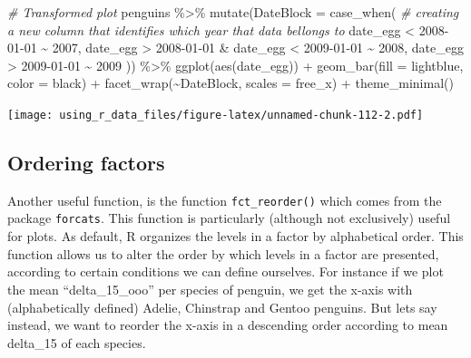 \documentclass[
]{book}
\newenvironment{Shaded}{\begin{snugshade}}{\end{snugshade}}
\newcommand{\AttributeTok}[1]{\textcolor[rgb]{0.77,0.63,0.00}{#1}}
\newcommand{\CommentTok}[1]{\textcolor[rgb]{0.56,0.35,0.01}{\textit{#1}}}
\newcommand{\FunctionTok}[1]{\textcolor[rgb]{0.00,0.00,0.00}{#1}}
\newcommand{\NormalTok}[1]{#1}
\newcommand{\SpecialCharTok}[1]{\textcolor[rgb]{0.00,0.00,0.00}{#1}}
\newcommand{\StringTok}[1]{\textcolor[rgb]{0.31,0.60,0.02}{#1}}
\begin{document}
\begin{Shaded}
\begin{Highlighting}[]
\CommentTok{\# Transformed plot}
\NormalTok{penguins }\SpecialCharTok{\%\textgreater{}\%} 
  \FunctionTok{mutate}\NormalTok{(}\AttributeTok{DateBlock =} \FunctionTok{case\_when}\NormalTok{(  }\CommentTok{\# creating a new column that identifies which year that data bellongs to}
\NormalTok{    date\_egg }\SpecialCharTok{\textless{}} \StringTok{\textquotesingle{}2008{-}01{-}01\textquotesingle{}} \SpecialCharTok{\textasciitilde{}} \StringTok{\textquotesingle{}2007\textquotesingle{}}\NormalTok{,}
\NormalTok{    date\_egg }\SpecialCharTok{\textgreater{}} \StringTok{\textquotesingle{}2008{-}01{-}01\textquotesingle{}} \SpecialCharTok{\&}\NormalTok{ date\_egg }\SpecialCharTok{\textless{}} \StringTok{\textquotesingle{}2009{-}01{-}01\textquotesingle{}} \SpecialCharTok{\textasciitilde{}} \StringTok{\textquotesingle{}2008\textquotesingle{}}\NormalTok{,}
\NormalTok{    date\_egg }\SpecialCharTok{\textgreater{}} \StringTok{\textquotesingle{}2009{-}01{-}01\textquotesingle{}}  \SpecialCharTok{\textasciitilde{}} \StringTok{\textquotesingle{}2009\textquotesingle{}}
\NormalTok{  )) }\SpecialCharTok{\%\textgreater{}\%} 
  \FunctionTok{ggplot}\NormalTok{(}\FunctionTok{aes}\NormalTok{(date\_egg)) }\SpecialCharTok{+}
  \FunctionTok{geom\_bar}\NormalTok{(}\AttributeTok{fill =} \StringTok{\textquotesingle{}lightblue\textquotesingle{}}\NormalTok{, }\AttributeTok{color =} \StringTok{\textquotesingle{}black\textquotesingle{}}\NormalTok{) }\SpecialCharTok{+} 
  \FunctionTok{facet\_wrap}\NormalTok{(}\SpecialCharTok{\textasciitilde{}}\NormalTok{DateBlock, }\AttributeTok{scales =} \StringTok{\textquotesingle{}free\_x\textquotesingle{}}\NormalTok{) }\SpecialCharTok{+}
  \FunctionTok{theme\_minimal}\NormalTok{()}
\end{Highlighting}
\end{Shaded}

\texttt{[image: using\_r\_data\_files/figure-latex/unnamed-chunk-112-2.pdf]}

\hypertarget{ordering-factors}{%
\subsection{Ordering factors}\label{ordering-factors}}

Another useful function, is the function \texttt{fct\_reorder()} which comes from the package \texttt{forcats}.
This function is particularly (although not exclusively) useful for plots.
As default, R organizes the levels in a factor by alphabetical order.
This function allows us to alter the order by which levels in a factor are presented, according to certain conditions we can define ourselves.
For instance if we plot the mean ``delta\_15\_ooo'' per species of penguin, we get the x-axis with (alphabetically defined) Adelie, Chinstrap and Gentoo penguins.
But lets say instead, we want to reorder the x-axis in a descending order according to mean delta\_15 of each species.
\end{document}
